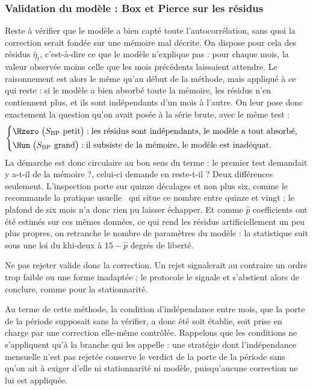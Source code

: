 \subsubsection*{Validation du modèle : Box et Pierce sur les résidus}

Reste à vérifier que le modèle a bien capté toute l'autocorrélation, sans
quoi la correction serait fondée sur une mémoire mal décrite. On dispose pour
cela des résidus \(\hat\eta_t\), c'est-à-dire ce que le modèle
n'explique pas : pour chaque mois, la valeur observée moins celle que les
mois précédents laissaient attendre. Le raisonnement est alors le même qu'au
début de la méthode, mais appliqué à ce qui reste : si le modèle a bien
absorbé toute la mémoire, les résidus n'en contiennent plus, et ils sont
indépendants d'un mois à l'autre. On leur pose donc exactement la question
qu'on avait posée à la série brute, avec le même test :
\[
  \begin{cases}
    \Hzero \;\bigl(S_{\mathrm{BP}} \text{ petit}\bigr) : \text{les résidus sont indépendants, le modèle a tout absorbé,}\\[2pt]
    \Hun \;\bigl(S_{\mathrm{BP}} \text{ grand}\bigr) : \text{il subsiste de la mémoire, le modèle est inadéquat.}
  \end{cases}
\]
La démarche est donc circulaire au bon sens du terme : le premier test
demandait y a-t-il de la mémoire ?, celui-ci demande en
reste-t-il ? Deux différences seulement. L'inspection porte sur quinze
décalages et non plus six, comme le recommande la pratique
usuelle~\cite{boxpierce1970} qui situe ce nombre entre quinze et vingt ; le
plafond de six mois n'a donc rien pu laisser échapper. Et comme \(\hat p\)
coefficients ont été estimés sur ces mêmes données, ce qui rend les résidus
artificiellement un peu plus propres, on retranche le nombre de paramètres du
modèle : la statistique suit sous \Hzero{} une loi du khi-deux à
\(15 - \hat p\) degrés de liberté.

Ne pas rejeter valide donc la correction. Un rejet signalerait au contraire
un ordre trop faible ou une forme inadaptée ; le protocole le signale et
s'abstient alors de conclure, comme pour la stationnarité.

Au terme de cette méthode, la condition d'indépendance entre mois, que la
porte de la période supposait sans la vérifier, a donc été soit établie, soit
prise en charge par une correction elle-même contrôlée. Rappelons que les
conditions ne s'appliquent qu'à la branche qui les appelle : une stratégie
dont l'indépendance mensuelle n'est pas rejetée conserve le verdict de la
porte de la période sans qu'on ait à exiger d'elle ni stationnarité ni modèle,
puisqu'aucune correction ne lui est appliquée.

